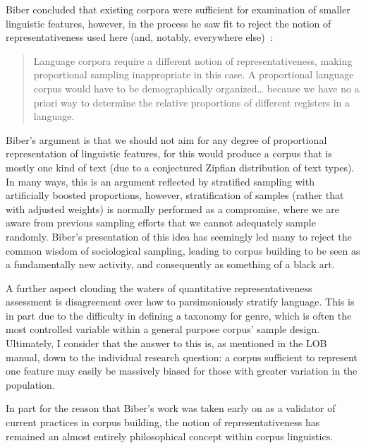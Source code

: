 Biber concluded that existing corpora were sufficient for examination of smaller linguistic features, however, in the process he saw fit to reject the notion of representativeness used here (and, notably, everywhere else)~\cite[p. 247]{biber1993representativeness}:

\begin{quote}
Language corpora require a different notion of representativeness, making proportional sampling inappropriate in this case. A proportional language corpus would have to be demographically organized\ldots
because we have no a priori way to determine the relative proportions of different registers in a language.
\end{quote}

Biber's argument is that we should not aim for any degree of proportional representation of linguistic features, for this would produce a corpus that is mostly one kind of text (due to a conjectured Zipfian distribution of text types).  In many ways, this is an argument reflected by stratified sampling with artificially boosted proportions, however, stratification of samples (rather that with adjusted weights) is normally performed as a compromise, where we are aware from previous sampling efforts that we cannot adequately sample randomly.  Biber's presentation of this idea has seemingly led many to reject the common wisdom of sociological sampling, leading to corpus building to be seen as a fundamentally new activity, and consequently as something of a black art.


A further aspect clouding the waters of quantitative representativeness assessment is disagreement over how to parsimoniously stratify language.  This is in part due to the difficulty in defining a taxonomy for genre\cite{lee2001genres}, which is often the most controlled variable within a general purpose corpus' sample design.  Ultimately, I consider that the answer to this is, as mentioned in the LOB manual, down to the individual research question: a corpus sufficient to represent one feature may easily be massively biased for those with greater variation in the population.



In part for the reason that Biber's work was taken early on as a validator of current practices in corpus building, the notion of representativeness has remained an almost entirely philosophical concept within corpus linguistics.



